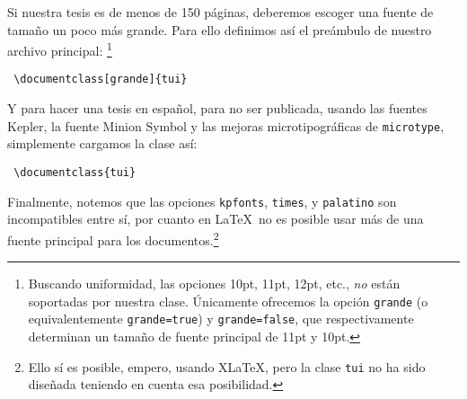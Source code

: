 \documentclass[11pt,
              article,
              oneside
              ]{memoir}
\newcommand*{\paquete}[1]{\texttt{\color{NavyBlue}#1}\xspace}
\newcommand*{\tui}{{\normalfont\paquete{tui}}\xspace}
\newcommand*{\XeLaTeX}{X\hspace*{-2pt}\raisebox{-2pt}{\rotatebox[origin=c]{-180}{E}}\LaTeX\xspace}
\begin{document}
\bigskip\noindent
Si nuestra tesis es de menos de 150 páginas, deberemos escoger una fuente de tamaño un poco más grande. Para ello definimos así el preámbulo de nuestro archivo principal:%
	\footnote{Buscando uniformidad, las opciones 10pt, 11pt, 12pt, etc., \emph{no} están soportadas por nuestra clase. Únicamente ofrecemos la opción \texttt{grande} (o equivalentemente \texttt{grande=true}) y \texttt{grande=false}, que respectivamente determinan un tamaño de fuente principal de 11pt y 10pt.}

\bigskip\noindent
\verb+ \documentclass[grande]{tui} +


\bigskip\noindent
Y para hacer una tesis en español, para no ser publicada, usando las fuentes Kepler, la fuente Minion Symbol y las mejoras microtipográficas de \paquete{microtype}, simplemente cargamos la clase así:

\bigskip\noindent
\verb+ \documentclass{tui} +

\bigskip\noindent
Finalmente, notemos que las opciones \texttt{kpfonts}, \texttt{times}, y \texttt{palatino} son incompatibles entre sí, por cuanto en \LaTeX\ no es posible usar más de una fuente principal para los documentos.\footnote{Ello sí es posible, empero, usando  \XeLaTeX, pero la clase \tui no ha sido diseñada teniendo en cuenta esa posibilidad.}
\end{document}
